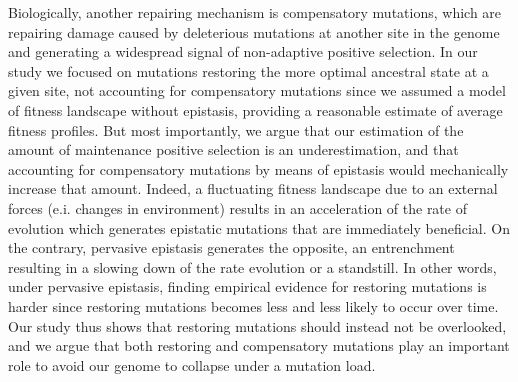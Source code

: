 \documentclass{article}
\begin{document}
    Biologically, another repairing mechanism is compensatory mutations, which are repairing damage caused by deleterious mutations at another site in the genome and generating a widespread signal of non-adaptive positive selection\cite{hartl_compensatory_1996, pollock_strong_2014, starr_epistasis_2016}.
    In our study we focused on mutations restoring the more optimal ancestral state at a given site, not accounting for compensatory mutations since we assumed a model of fitness landscape without epistasis, providing a reasonable estimate of average fitness profiles\cite{youssef_consequences_2020}.
    But most importantly, we argue that our estimation of the amount of maintenance positive selection is an underestimation, and that accounting for compensatory mutations by means of epistasis would mechanically increase that amount.
    Indeed, a fluctuating fitness landscape due to an external forces (e.i. changes in environment) results in an acceleration of the rate of evolution\cite{ rodrigue_detecting_2017, rodrigue_bayesian_2021} which generates epistatic mutations that are immediately beneficial\cite{gong_epistatically_2014}.
    On the contrary, pervasive epistasis generates the opposite, an entrenchment\cite{goldstein_evolutionary_2004, goldstein_nonadaptive_2015} resulting in a slowing down of the rate evolution\cite{rodrigue_detecting_2017, patel_epistasis_2022} or a standstill\cite{youssef_evolution_2022}.
    In other words, under pervasive epistasis, finding empirical evidence for restoring mutations is harder since restoring mutations becomes less and less likely to occur over time\cite{goldstein_nonadaptive_2015, goldstein_sequence_2017, park_epistatic_2022}.
    Our study thus shows that restoring mutations should instead not be overlooked, and we argue that both restoring and compensatory mutations play an important role to avoid our genome to collapse under a mutation load.
\end{document}

